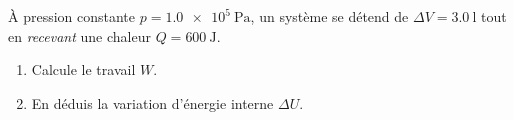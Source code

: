 \documentclass[11pt,a4paper]{article}
\begin{document}
\begin{exo}
À pression constante $p=\qty{1.0e5}{\pascal}$, un système se détend de $\Delta V=\qty{+3.0}{\litre}$ tout en \emph{recevant} une chaleur $Q=\qty{+600}{\joule}$.
\begin{enumerate}[label=\alph*)]
  \item Calcule le travail $W$.
  \item En déduis la variation d'énergie interne $\Delta U$.
\end{enumerate}
\end{exo}
\end{document}
